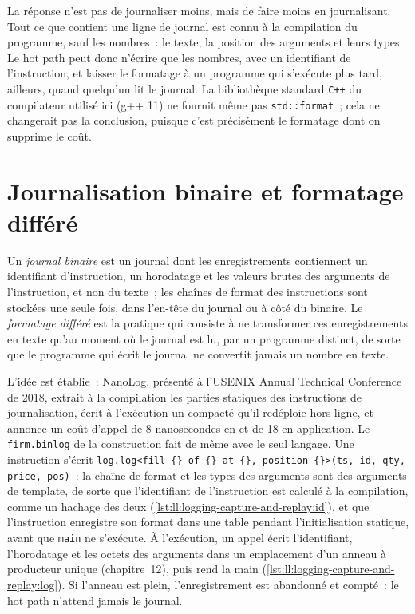La réponse n'est pas de journaliser moins, mais de faire moins en journalisant. Tout ce que contient une ligne de journal est connu à la compilation
du programme, sauf les nombres~: le texte, la position des arguments et leurs types. Le hot path peut donc n'écrire que les nombres,
avec un identifiant de l'instruction, et laisser le formatage à un programme qui s'exécute plus tard, ailleurs, quand quelqu'un lit
le journal. La bibliothèque standard \texttt{C++} du compilateur utilisé ici (g++ 11) ne fournit même pas \texttt{std::format}~; cela ne
changerait pas la conclusion, puisque c'est précisément le formatage dont on supprime le coût.

\section{Journalisation binaire et formatage différé}

\begin{definition}\label{def:ll:logging-capture-and-replay:binlog}
Un \emph{journal binaire} est un journal dont les enregistrements contiennent un identifiant d'instruction, un horodatage et les valeurs brutes des
arguments de l'instruction, et non du texte~; les chaînes de format des instructions sont stockées une seule fois, dans l'en-tête du journal ou à côté du binaire.
Le \emph{formatage différé} est la pratique qui consiste à ne transformer ces enregistrements en texte qu'au moment où le journal est
lu, par un programme distinct, de sorte que le programme qui écrit le journal ne convertit jamais un nombre en texte.
\end{definition}

L'idée est établie~: NanoLog, présenté à l'USENIX Annual Technical Conference de 2018, extrait à la compilation les parties statiques des instructions
de journalisation, écrit à l'exécution un  compacté qu'il redéploie hors ligne, et annonce un coût
d'appel de 8 nanosecondes en  et de 18 en application. Le \texttt{firm.binlog} de la construction fait de même avec le
seul langage. Une instruction s'écrit \texttt{log.log<\textquotedbl{}fill \{\} of \{\} at \{\}, position \{\}\textquotedbl{}>(ts, id, qty, price, pos)}~: la chaîne
de format et les types des arguments sont des arguments de template, de sorte que l'identifiant de l'instruction est calculé à la compilation, comme un hachage des deux
(\cref{lst:ll:logging-capture-and-replay:id}), et que l'instruction enregistre son format dans une table pendant l'initialisation statique,
avant que \texttt{main} ne s'exécute. À l'exécution, un appel écrit l'identifiant, l'horodatage et les octets des arguments dans un emplacement d'un
anneau à producteur unique (chapitre~12), puis rend la main (\cref{lst:ll:logging-capture-and-replay:log}). Si l'anneau est plein, l'enregistrement
est abandonné et compté~: le hot path n'attend jamais le journal.

